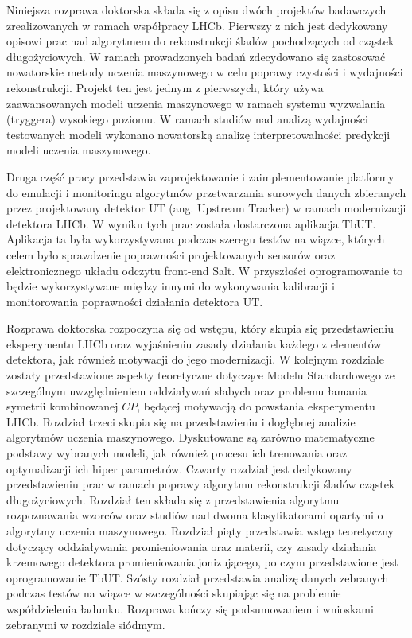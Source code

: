 
Niniejsza rozprawa doktorska składa się z opisu dwóch projektów badawczych zrealizowanych w ramach współpracy LHCb. Pierwszy z nich jest dedykowany opisowi prac nad algorytmem do rekonstrukcji śladów pochodzących od cząstek długożyciowych. W ramach prowadzonych badań zdecydowano się zastosować nowatorskie metody uczenia maszynowego w celu poprawy czystości i wydajności rekonstrukcji. Projekt ten jest jednym z pierwszych, który używa zaawansowanych modeli uczenia maszynowego w ramach systemu wyzwalania (tryggera) wysokiego poziomu. W ramach studiów nad analizą wydajności testowanych modeli wykonano nowatorską analizę interpretowalności predykcji modeli uczenia maszynowego. 

 Druga część pracy przedstawia zaprojektowanie i zaimplementowanie platformy do emulacji i monitoringu algorytmów przetwarzania surowych danych zbieranych przez projektowany detektor UT (ang. Upstream Tracker) w ramach modernizacji detektora LHCb. W wyniku tych prac została dostarczona aplikacja TbUT. Aplikacja ta była wykorzystywana podczas szeregu testów na wiązce, których celem było sprawdzenie poprawności projektowanych sensorów oraz elektronicznego układu odczytu front-end Salt. W przyszłości oprogramowanie to będzie wykorzystywane między innymi do wykonywania kalibracji i monitorowania poprawności działania detektora UT.  


Rozprawa doktorska rozpoczyna się od wstępu, który skupia się przedstawieniu eksperymentu LHCb oraz wyjaśnieniu zasady działania każdego z elementów detektora, jak również motywacji do jego modernizacji. W kolejnym rozdziale zostały przedstawione aspekty teoretyczne dotyczące Modelu Standardowego ze szczególnym uwzględnieniem oddziaływań słabych oraz problemu łamania symetrii kombinowanej $CP$, będącej motywacją do powstania eksperymentu LHCb. Rozdział trzeci skupia się na przedstawieniu i dogłębnej analizie algorytmów uczenia maszynowego. Dyskutowane są zarówno matematyczne podstawy wybranych modeli, jak również procesu ich trenowania oraz optymalizacji ich hiper parametrów. Czwarty rozdział jest dedykowany przedstawieniu prac w ramach poprawy algorytmu rekonstrukcji śladów cząstek długożyciowych. Rozdział ten składa się z przedstawienia algorytmu rozpoznawania wzorców oraz studiów nad dwoma klasyfikatorami opartymi o algorytmy uczenia maszynowego. Rozdział piąty przedstawia wstęp teoretyczny dotyczący oddziaływania promieniowania oraz materii, czy zasady działania krzemowego detektora promieniowania jonizującego, po czym przedstawione jest oprogramowanie TbUT. Szósty rozdział przedstawia analizę danych zebranych podczas testów na wiązce w szczególności skupiając się na problemie współdzielenia ładunku. Rozprawa kończy się  podsumowaniem i wnioskami zebranymi w rozdziale siódmym. 
